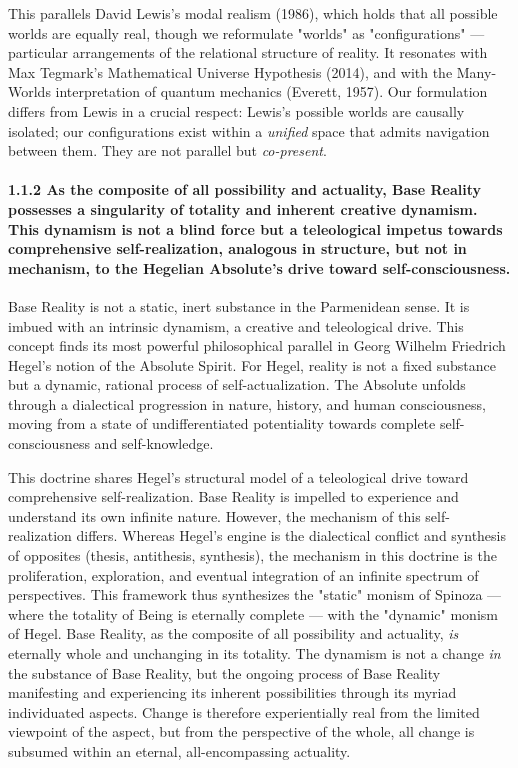 This parallels David Lewis's modal realism (1986), which holds that all possible worlds are equally real, though we reformulate "worlds" as "configurations" — particular arrangements of the relational structure of reality. It resonates with Max Tegmark's Mathematical Universe Hypothesis (2014), and with the Many-Worlds interpretation of quantum mechanics (Everett, 1957). Our formulation differs from Lewis in a crucial respect: Lewis's possible worlds are causally isolated; our configurations exist within a \textit{unified} space that admits navigation between them. They are not parallel but \textit{co-present}.


\paragraph*{1.1.2 As the composite of all possibility and actuality, Base Reality possesses a singularity of totality and inherent creative dynamism. This dynamism is not a blind force but a teleological impetus towards comprehensive self-realization, analogous in structure, but not in mechanism, to the Hegelian Absolute's drive toward self-consciousness.}


Base Reality is not a static, inert substance in the Parmenidean sense. It is imbued with an intrinsic dynamism, a creative and teleological drive. This concept finds its most powerful philosophical parallel in Georg Wilhelm Friedrich Hegel's notion of the Absolute Spirit. For Hegel, reality is not a fixed substance but a dynamic, rational process of self-actualization. The Absolute unfolds through a dialectical progression in nature, history, and human consciousness, moving from a state of undifferentiated potentiality towards complete self-consciousness and self-knowledge.


This doctrine shares Hegel's structural model of a teleological drive toward comprehensive self-realization. Base Reality is impelled to experience and understand its own infinite nature. However, the mechanism of this self-realization differs. Whereas Hegel's engine is the dialectical conflict and synthesis of opposites (thesis, antithesis, synthesis), the mechanism in this doctrine is the proliferation, exploration, and eventual integration of an infinite spectrum of perspectives. This framework thus synthesizes the "static" monism of Spinoza — where the totality of Being is eternally complete — with the "dynamic" monism of Hegel. Base Reality, as the composite of all possibility and actuality, \textit{is} eternally whole and unchanging in its totality. The dynamism is not a change \textit{in} the substance of Base Reality, but the ongoing process of Base Reality manifesting and experiencing its inherent possibilities through its myriad individuated aspects. Change is therefore experientially real from the limited viewpoint of the aspect, but from the perspective of the whole, all change is subsumed within an eternal, all-encompassing actuality.


